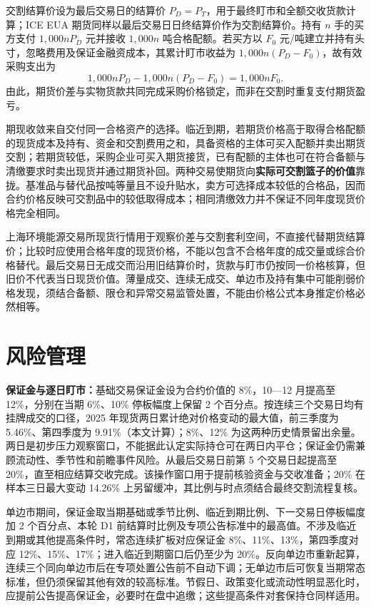 \documentclass[UTF8,a4paper,11pt,oneside,fontset=fandol]{ctexart}
\begin{document}
交割结算价设为最后交易日的结算价 $P_D=P_T$，用于最终盯市和全额交收货款计算；ICE EUA 期货同样以最后交易日日终结算价作为交割结算价\cite{iceEuaSpecs}。持有 $n$ 手的买方支付 $1{,}000nP_D$ 元并接收 $1{,}000n$ 吨合格配额。若买方以 $F_0$ 元/吨建立并持有头寸，忽略费用及保证金融资成本，其累计盯市收益为 $1{,}000n(P_D-F_0)$，故有效采购支出为
\[
 1{,}000nP_D-1{,}000n(P_D-F_0)=1{,}000nF_0.
\]
由此，期货价差与实物货款共同完成采购价格锁定，而非在交割时重复支付期货盈亏。

期现收敛来自交付同一合格资产的选择。临近到期，若期货价格高于取得合格配额的现货成本及持有、资金和交割费用之和，具备资格的主体可买入配额并卖出期货交割；若期货较低，采购企业可买入期货接货，已有配额的主体也可在符合备额与清缴要求时卖出现货并通过期货补回。两种交易使期货向\textbf{实际可交割篮子的价值}靠拢。基准品与替代品按吨等量且不设升贴水，卖方可选择成本较低的合格品，因而合约价格反映可交割品中的较低取得成本；相同清缴效力并不保证不同年度现货价格完全相同。

上海环境能源交易所现货行情用于观察价差与交割套利空间，不直接代替期货结算价；比较时应使用合格年度的现货价格，不能以包含不合格年度的成交量或综合价格替代。最后交易日无成交而沿用旧结算价时，货款与盯市仍按同一价格核算，但旧价不代表当日现货价值。薄量成交、连续无成交、单边市及持有集中可能削弱价格发现，须结合备额、限仓和异常交易监管处置，不能由价格公式本身推定价格必然相等。

\section{风险管理}
\noindent\textbf{保证金与逐日盯市：}基础交易保证金设为合约价值的 8\%，10—12 月提高至 12\%，分别在当期 6\%、10\% 停板幅度上保留 2 个百分点。按连续三个交易日均有挂牌成交的口径，2025 年现货两日累计绝对价格变动的最大值，前三季度为 5.46\%、第四季度为 9.91\%\cite{she2025daily}（本文计算）；8\%、12\% 为这两种历史情景留出余量。两日是初步压力观察窗口，不能据此认定实际持仓可在两日内平仓；保证金仍需兼顾流动性、季节性和前瞻事件风险\cite{cmeMarginModel}。从最后交易日前第 5 个交易日起提高至 20\%，直至相应结算交收完成。该操作窗口用于提前核验资金与交收准备；20\% 在样本三日最大变动 14.26\% 上另留缓冲，其比例与时点须结合最终交割流程复核。

单边市期间，保证金取当期基础或季节比例、临近到期比例、下一交易日停板幅度加 2 个百分点、本轮 D1 前结算时比例及专项公告标准中的最高值\cite{gfexRisk2022reprint}。不涉及临近到期或其他提高条件时，常态连续扩板对应保证金 8\%、11\%、13\%，第四季度对应 12\%、15\%、17\%；进入临近到期窗口后仍至少为 20\%。反向单边市重新起算，连续三个同向单边市后在专项处置公告前不自动下调；无单边市后可恢复当期常态标准，但仍须保留其他有效的较高标准。节假日、政策变化或流动性明显恶化时，应提前公告提高保证金，必要时在盘中追缴；这些提高条件对套保持仓同样适用。
\end{document}
